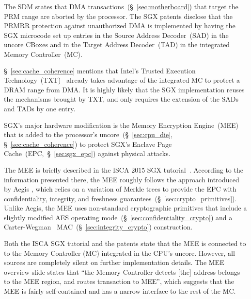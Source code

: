 \label{sec:sgx_uncore_modifications}


The SDM states that DMA transactions~(\S~\ref{sec:motherboard}) that target the
PRM range are aborted by the processor. The SGX patents disclose that the PRMRR
protection against unauthorized DMA is implemented by having the SGX microcode
set up entries in the Source Address Decoder~(SAD) in the uncore CBoxes and in
the Target Address Decoder~(TAD) in the integrated Memory Controller~(MC).

\S~\ref{sec:cache_coherence} mentions that Intel's Trusted Execution
Technology~(TXT)~\cite{grawrock2009txt} already takes advantage of the
integrated MC to protect a DRAM range from DMA. It is highly likely that the
SGX implementation reuses the mechanisms brought by TXT, and only requires the
extension of the SADs and TADs by one entry.

SGX's major hardware modification is the Memory Encryption Engine~(MEE) that is
added to the processor's uncore~(\S~\ref{sec:cpu_die},
\S~\ref{sec:cache_coherence}) to protect SGX's Enclave Page
Cache~(EPC,~\S~\ref{sec:sgx_epc}) against physical attacks.


The MEE is briefly described in the ISCA 2015 SGX
tutorial~\cite{intel2015iscasgx}. According to the information presented there,
the MEE roughly follows the approach introduced by Aegis \cite{suh2003aegis}
\cite{aegis_impl}, which relies on a variation of Merkle trees to provide the
EPC with confidentiality, integrity, and freshness
guarantees~(\S~\ref{sec:crypto_primitives}). Unlike Aegis, the MEE uses
non-standard cryptographic primitives that include a slightly modified AES
operating mode~(\S~\ref{sec:confidentiality_crypto}) and a
Carter-Wegman~\cite{carter1977mac, wegman1981mac}
MAC~(\S~\ref{sec:integrity_crypto}) construction.


Both the ISCA SGX tutorial and the patents state that the MEE is connected to
to the Memory Controller (MC) integrated in the CPU's uncore. However, all
sources are completely silent on further implementation details. The
MEE overview slide states that ``the Memory Controller detects [the] address
belongs to the MEE region, and routes transaction to MEE'', which suggests that
the MEE is fairly self-contained and has a narrow interface to the rest of the
MC.

